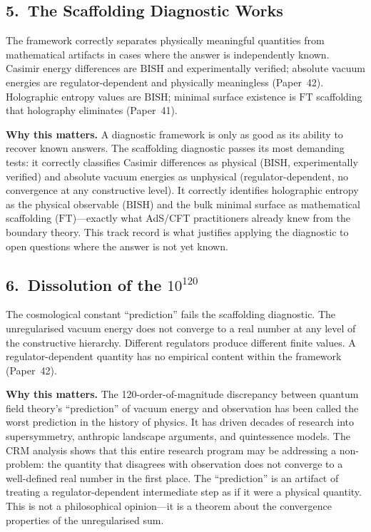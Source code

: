 \documentclass[11pt,a4paper]{report}
\theoremstyle{plain}
\theoremstyle{definition}
\theoremstyle{remark}
\newcommand{\BISH}{\mathrm{BISH}}
\newcommand{\FT}{\mathrm{FT}}
\begin{document}
\subsection*{5.\ The Scaffolding Diagnostic Works}

The framework correctly separates physically meaningful quantities from mathematical artifacts in cases where the answer is independently known.  Casimir energy differences are $\BISH$ and experimentally verified; absolute vacuum energies are regulator-dependent and physically meaningless (Paper~42).  Holographic entropy values are $\BISH$; minimal surface existence is $\FT$ scaffolding that holography eliminates (Paper~41).

\medskip\noindent
\textbf{Why this matters.}\quad
A diagnostic framework is only as good as its ability to recover known answers.  The scaffolding diagnostic passes its most demanding tests: it correctly classifies Casimir differences as physical ($\BISH$, experimentally verified) and absolute vacuum energies as unphysical (regulator-dependent, no convergence at any constructive level).  It correctly identifies holographic entropy as the physical observable ($\BISH$) and the bulk minimal surface as mathematical scaffolding ($\FT$)---exactly what AdS/CFT practitioners already knew from the boundary theory.  This track record is what justifies applying the diagnostic to open questions where the answer is not yet known.

\subsection*{6.\ Dissolution of the $10^{120}$}

The cosmological constant ``prediction'' fails the scaffolding diagnostic.  The unregularised vacuum energy does not converge to a real number at any level of the constructive hierarchy.  Different regulators produce different finite values.  A regulator-dependent quantity has no empirical content within the framework (Paper~42).

\medskip\noindent
\textbf{Why this matters.}\quad
The 120-order-of-magnitude discrepancy between quantum field theory's ``prediction'' of vacuum energy and observation has been called the worst prediction in the history of physics.  It has driven decades of research into supersymmetry, anthropic landscape arguments, and quintessence models.  The CRM analysis shows that this entire research program may be addressing a non-problem: the quantity that disagrees with observation does not converge to a well-defined real number in the first place.  The ``prediction'' is an artifact of treating a regulator-dependent intermediate step as if it were a physical quantity.  This is not a philosophical opinion---it is a theorem about the convergence properties of the unregularised sum.
\end{document}
